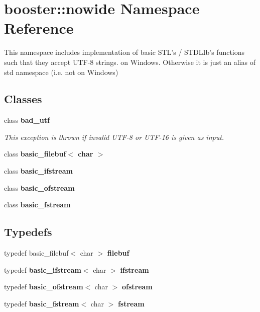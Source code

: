 \section{booster\-:\-:nowide \-Namespace \-Reference}
\label{namespacebooster_1_1nowide}


\-This namespace includes implementation of basic \-S\-T\-L's / \-S\-T\-D\-L\-Ib's functions such that they accept \-U\-T\-F-\/8 strings. on \-Windows. \-Otherwise it is just an alias of std namespace (i.\-e. not on \-Windows)  


\subsection*{\-Classes}
\begin{DoxyCompactItemize}
\item 
class {\bf bad\-\_\-utf}
\begin{DoxyCompactList}\small\item\em \-This exception is thrown if invalid \-U\-T\-F-\/8 or \-U\-T\-F-\/16 is given as input. \end{DoxyCompactList}\item 
class {\bf basic\-\_\-filebuf$<$ char $>$}
\item 
class {\bf basic\-\_\-ifstream}
\item 
class {\bf basic\-\_\-ofstream}
\item 
class {\bf basic\-\_\-fstream}
\end{DoxyCompactItemize}
\subsection*{\-Typedefs}
\begin{DoxyCompactItemize}
\item 
typedef basic\-\_\-filebuf$<$ char $>$ {\bf filebuf}
\item 
typedef {\bf basic\-\_\-ifstream}$<$ char $>$ {\bf ifstream}
\item 
typedef {\bf basic\-\_\-ofstream}$<$ char $>$ {\bf ofstream}
\item 
typedef {\bf basic\-\_\-fstream}$<$ char $>$ {\bf fstream}
\end{DoxyCompactItemize}

